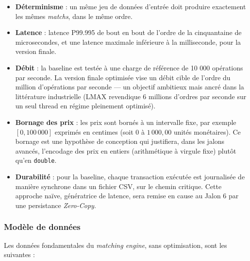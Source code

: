\begin{itemize}
    \item \textbf{Déterminisme} : un même jeu de données d'entrée doit produire exactement les mêmes \textit{matchs}, dans le même ordre.
    \item \textbf{Latence} : latence P99.995 de bout en bout de l'ordre de la cinquantaine de microsecondes, et une latence maximale inférieure à la milliseconde, pour la version finale.
    \item \textbf{Débit} : la baseline est testée à une charge de référence de 10 000 opérations par seconde. La version finale optimisée vise un débit cible de l'ordre du million d'opérations par seconde — un objectif ambitieux mais ancré dans la littérature industrielle (LMAX revendique 6 millions d'ordres par seconde sur un seul thread en régime pleinement optimisé).
    \item \textbf{Bornage des prix} : les prix sont bornés à un intervalle fixe, par exemple $[0, 100\,000]$ exprimés en centimes (soit $0$ à $1\,000{,}00$ unités monétaires). Ce bornage est une hypothèse de conception qui justifiera, dans les jalons avancés, l'encodage des prix en entiers (arithmétique à virgule fixe) plutôt qu'en \texttt{double}.
    \item \textbf{Durabilité} : pour la baseline, chaque transaction exécutée est journalisée de manière synchrone dans un fichier CSV, sur le chemin critique. Cette approche naïve, génératrice de latence, sera remise en cause au Jalon 6 par une persistance \textit{Zero-Copy}.
\end{itemize}

\subsubsection{Modèle de données}

Les données fondamentales du \textit{matching engine}, sans optimisation, sont les suivantes :

